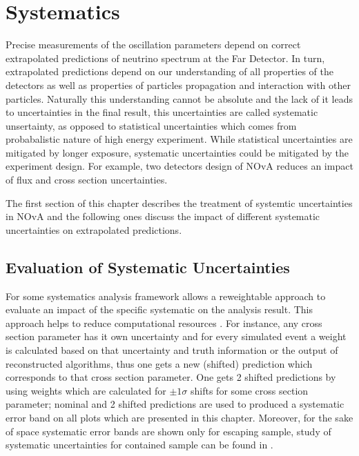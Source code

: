\chapter{Systematics}
\label{systematic_chapter}

Precise measurements of the oscillation parameters depend on correct extrapolated predictions of neutrino spectrum at 
the Far Detector. In turn, extrapolated predictions depend on our understanding of all properties of the detectors as
well as properties of particles propagation and interaction with other particles. Naturally this understanding cannot 
be absolute and the lack of it leads to uncertainties in the final result, this uncertainties are called systematic 
unsertainty, as opposed to statistical uncertainties which comes from probabalistic nature of high energy experiment.
While statistical uncertainties are mitigated by longer exposure, systematic uncertainties could be mitigated by the
experiment design. For example, two detectors design of NOvA reduces an impact of flux and cross section uncertainties.

The first section of this chapter describes the treatment of systemtic uncertainties in NOvA and the following ones
discuss the impact of different systematic uncertainties on extrapolated predictions. 

\section{Evaluation of Systematic Uncertainties}
For some systematics analysis framework allows a reweightable approach to evaluate an impact of the specific systematic
on the analysis result. This approach helps to reduce computational resources \cite{cafana}. For instance, any cross section 
parameter has it own uncertainty and for every simulated event a weight is calculated based on that uncertainty and 
truth information or the output of reconstructed algorithms, thus one gets a new (shifted) prediction which 
corresponds to that cross section parameter. One gets 2 shifted predictions by using weights which are calculated for 
$\pm 1\sigma$ shifts for some cross section parameter; nominal and 2 shifted predictions are used to produced a 
systematic error band on all plots which are presented in this chapter. Moreover, for the sake of space systematic 
error bands are shown only for escaping sample, study of systematic uncertainties for contained sample can be found in
\cite{Luke}.

